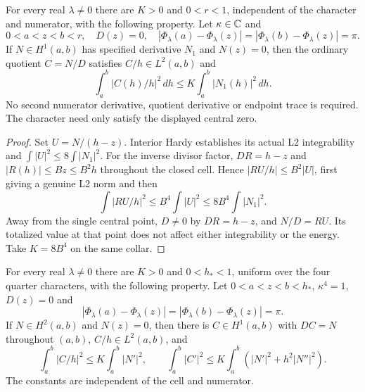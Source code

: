 \begin{lemma}
\label{lem:phase-cell-second-mass-estimates}
\leanok
For every real $\lambda\ne0$ there are $K>0$ and $0<r<1$, independent
of the character and numerator, with the following property.
Let $\kappa\in\mathbb{C}$ and
\[
 0<a<z<b<r,\quad D(z)=0,\quad
 |\Phi_\lambda(a)-\Phi_\lambda(z)|
 =|\Phi_\lambda(b)-\Phi_\lambda(z)|=\pi.
\]
If $N\in H^1(a,b)$ has specified derivative $N_1$ and $N(z)=0$, then
the ordinary quotient $C=N/D$ satisfies $C/h\in L^2(a,b)$ and
\[
 \int_a^b |C(h)/h|^2\,dh
 \le K\int_a^b |N_1(h)|^2\,dh.
\]
No second numerator derivative, quotient derivative or endpoint trace is
required. The character need only satisfy the displayed central zero.
\end{lemma}

\begin{proof}
\leanok
Set $U=N/(h-z)$. Interior Hardy establishes its actual L2 integrability
and $\int|U|^2\le8\int|N_1|^2$.
For the inverse divisor factor, $DR=h-z$ and
$|R(h)|\le Bz\le B^2h$ throughout the closed cell.
Hence $|RU/h|\le B^2|U|$, first giving a genuine L2 norm and then
\[
 \int|RU/h|^2\le B^4\int|U|^2\le8B^4\int|N_1|^2.
\]
Away from the single central point, $D\ne0$ by $DR=h-z$, and
$N/D=RU$. Its totalized value at that point does not affect either
integrability or the energy. Take $K=8B^4$ on the same collar.
\end{proof}

\begin{lemma}
\label{lem:phase-cell-estimates}
\leanok
For every real $\lambda\ne0$ there are $K>0$ and $0<h_*<1$, uniform over
the four quarter characters, with the following property.
Let $0<a<z<b<h_*$, $\kappa^4=1$, $D(z)=0$ and
\[
 |\Phi_\lambda(a)-\Phi_\lambda(z)|
 =|\Phi_\lambda(b)-\Phi_\lambda(z)|=\pi .
\]
If $N\in H^2(a,b)$ and $N(z)=0$, then there is $C\in H^1(a,b)$ with
$D C=N$ throughout $(a,b)$, $C/h\in L^2(a,b)$, and
\[
 \int_a^b|C/h|^2\le K\int_a^b|N'|^2,\qquad
 \int_a^b|C'|^2\le K\int_a^b(|N'|^2+h^2|N''|^2).
\]
The constants are independent of the cell and numerator.
\end{lemma}

